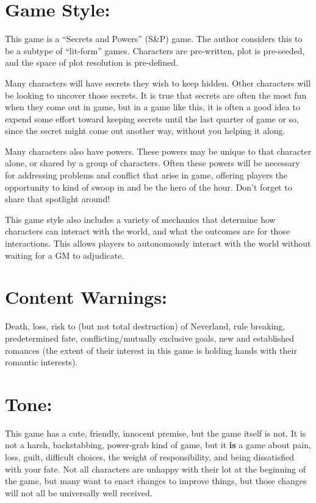\documentclass[sheet]{PP}
\begin{document}

\section*{Game Style:}
This game is a “Secrets and Powers” (S&P) game. The author considers this to be a subtype of “lit-form” games. Characters are pre-written, plot is pre-seeded, and the space of plot resolution is pre-defined. 

Many characters will have secrets they wish to keep hidden. Other characters will be looking to uncover those secrets. It is true that secrets are often the most fun when they come out in game, but in a game like this, it is often a good idea to expend some effort toward keeping secrets until the last quarter of game or so, since the secret might come out another way, without you helping it along.

Many characters also have powers. These powers may be unique to that character alone, or shared by a group of characters. Often these powers will be necessary for addressing problems and conflict that arise in game, offering players the opportunity to kind of swoop in and be the hero of the hour. Don’t forget to share that spotlight around!

This game style also includes a variety of mechanics that determine how characters can interact with the world, and what the outcomes are for those interactions. This allows players to autonomously interact with the world without waiting for a GM to adjudicate.


\section*{Content Warnings:}
Death, loss, risk to (but not total destruction) of Neverland, rule breaking, predetermined fate, conflicting/mutually exclusive goals, new and established romances (the extent of their interest in this game is holding hands with their romantic interests).

\section*{Tone:}
This game has a cute, friendly, innocent premise, but the game itself is not. It is not a harsh, backstabbing, power-grab kind of game, but it \textbf{is} a game about pain, loss, guilt, difficult choices, the weight of responsibility, and being dissatisfied with your fate. Not all characters are unhappy with their lot at the beginning of the game, but many want to enact changes to improve things, but those changes will not all be universally well received.
\end{document}

